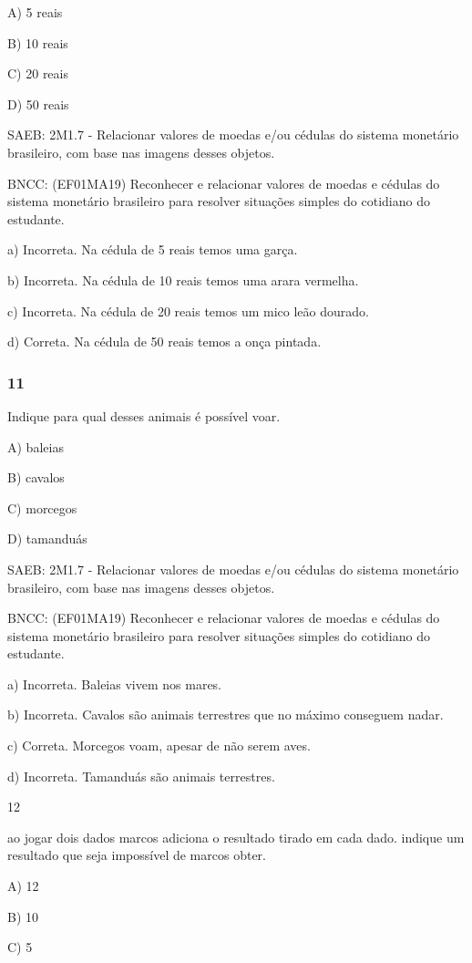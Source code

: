 \begin{itemize}
\begin{itemize}
A) 5 reais

B) 10 reais

C) 20 reais

D) 50 reais

SAEB: 2M1.7 - Relacionar valores de moedas e/ou cédulas do sistema
monetário brasileiro, com base nas imagens desses objetos.

BNCC: (EF01MA19) Reconhecer e relacionar valores de moedas e cédulas do
sistema monetário brasileiro para resolver situações simples do
cotidiano do estudante.

a) Incorreta. Na cédula de 5 reais temos uma garça.

b) Incorreta. Na cédula de 10 reais temos uma arara vermelha.

c) Incorreta. Na cédula de 20 reais temos um mico leão dourado.

d) Correta. Na cédula de 50 reais temos a onça pintada.

\subsubsection{11 }\label{section-142}

Indique para qual desses animais é possível voar.

A) baleias

B) cavalos

C) morcegos

D) tamanduás

SAEB: 2M1.7 - Relacionar valores de moedas e/ou cédulas do sistema
monetário brasileiro, com base nas imagens desses objetos.

BNCC: (EF01MA19) Reconhecer e relacionar valores de moedas e cédulas do
sistema monetário brasileiro para resolver situações simples do
cotidiano do estudante.

a) Incorreta. Baleias vivem nos mares.

b) Incorreta. Cavalos são animais terrestres que no máximo conseguem
nadar.

c) Correta. Morcegos voam, apesar de não serem aves.

d) Incorreta. Tamanduás são animais terrestres.

\num{12}

ao jogar dois dados marcos adiciona o resultado tirado em cada dado.
indique um resultado que seja impossível de marcos obter.

A) 12

B) 10

C) 5


\end{itemize}
\end{itemize}

